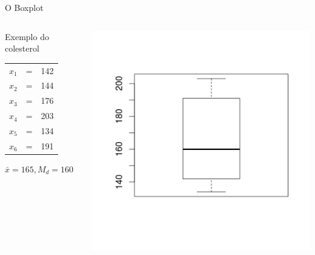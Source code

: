 \documentclass{beamer}
\begin{document}
\begin{frame}{O Boxplot}
  \begin{example}
    \begin{columns}
      \begin{column}{5cm}
        Exemplo do colesterol
        \begin{tabular}{ccc}
          $x_1$ &=&142\\
          $x_2$ &=&144\\
          $x_3$ &=&176\\
          $x_4$ &=&203\\
          $x_5$ &=&134\\
          $x_6$ &=&191\\
        \end{tabular}
        $\bar{x}=165, M_d=160$
      \end{column}
      \begin{column}{5cm}
        \includegraphics[height=0.6\textheight]{boxplot2}
      \end{column}
    \end{columns}
  \end{example}
\end{frame}
\end{document}
